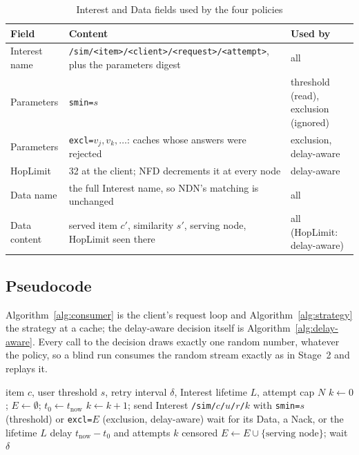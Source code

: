 \documentclass[11pt,a4paper]{article}
\renewcommand{\arraystretch}{1.45}
\newcommand{\code}[1]{\texttt{#1}}
\begin{document}
\begin{table}[H]
\centering
\caption{Interest and Data fields used by the four policies}
\label{tab:packets}
\small
\renewcommand{\arraystretch}{1.2}
\begin{tabularx}{\linewidth}{@{}>{\raggedright}p{2.2cm}>{\raggedright}X>{\raggedright\arraybackslash}p{3.6cm}@{}}
\toprule
\textbf{Field} & \textbf{Content} & \textbf{Used by} \\
\midrule
Interest name & \code{/sim/<item>/<client>/<request>/<attempt>}, plus the parameters digest & all \\
Parameters & \code{smin=}$s$ & threshold (read), exclusion (ignored) \\
Parameters & \code{excl=}$v_j, v_k, \dots$: caches whose answers were rejected & exclusion, delay-aware \\
HopLimit & 32 at the client; NFD decrements it at every node & delay-aware \\
Data name & the full Interest name, so NDN's matching is unchanged & all \\
Data content & served item $c'$, similarity $s'$, serving node, HopLimit seen there & all (HopLimit: delay-aware) \\
\bottomrule
\end{tabularx}
\end{table}

\subsection{Pseudocode}
Algorithm~\ref{alg:consumer} is the client's request loop and Algorithm~\ref{alg:strategy} the
strategy at a cache; the delay-aware decision itself is Algorithm~\ref{alg:delay-aware}. Every call
to the decision draws exactly one random number, whatever the policy, so a blind run consumes the
random stream exactly as in Stage~2 and replays it.

\begin{algorithm}[H]
\caption{Client request loop (\code{SimConsumer})}
\label{alg:consumer}
\begin{algorithmic}[1]
\Require item $c$, user threshold $s$, retry interval $\delta$, Interest lifetime $L$, attempt cap $N$
\State $k \gets 0$; \quad $E \gets \emptyset$; \quad $t_0 \gets t_{\mathrm{now}}$
\Loop
  \State $k \gets k + 1$; send Interest \code{/sim/}$c$\code{/}$u$\code{/}$r$\code{/}$k$ with
         \code{smin=}$s$ (threshold) or \code{excl=}$E$ (exclusion, delay-aware)
  \State wait for its Data, a Nack, or the lifetime $L$
    \State \Return delay $t_{\mathrm{now}} - t_0$ and attempts $k$ 
  \EndIf
   \State \Return censored \EndIf
    \State $E \gets E \cup \{\text{serving node}\}$; wait $\delta$ 
  \EndIf
\EndLoop
\end{algorithmic}
\end{algorithm}
\end{document}
